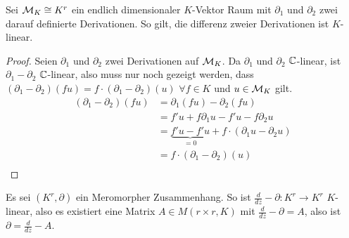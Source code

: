 \begin{lem} Sei $\mathcal{M}_K\cong K^r$ ein endlich dimensionaler $K$-Vektor Raum mit
  $\partial_1$ und $\partial_2$ zwei darauf definierte Derivationen. So gilt,
  die differenz zweier Derivationen ist $K$-linear.
\end{lem}
\begin{proof}
  Seien $\partial_1$ und $\partial_2$ zwei Derivationen auf $\mathcal{M}_K$.
  Da $\partial_1$ und $\partial_2$ $\mathbb{C}$-linear, ist $\partial_1-\partial_2$
  $\mathbb{C}$-linear, also muss nur noch gezeigt werden, dass
  $(\partial_1-\partial_2)(fu)=f\cdot(\partial_1-\partial_2)(u)$ $\forall f\in
  K$ und $u\in\mathcal{M}_K$ gilt.\\
  \begin{align*}
    (\partial_1-\partial_2)(fu) &= \partial_1(fu)-\partial_2(fu)\\
    &= f'u+f\partial_1u-f'u-f\partial_2u\\
    &= \underset{=0}{\underbrace{f'u-f'u}}+f\cdot(\partial_1u-\partial_2u)\\
    &= f\cdot(\partial_1-\partial_2)(u)\\
  \end{align*}
\end{proof}
\begin{cor}
  Es sei $(K^r,\partial)$ ein Meromorpher Zusammenhang.  So ist
  $\frac{d}{dz}-\partial:K^r\rightarrow K^r$ $K$-linear, also es existiert eine
  Matrix $A\in M(r\times r,K)$ mit $\frac{d}{dz}-\partial=A$, also ist
  $\partial=\frac{d}{dz}-A$.
\end{cor}



